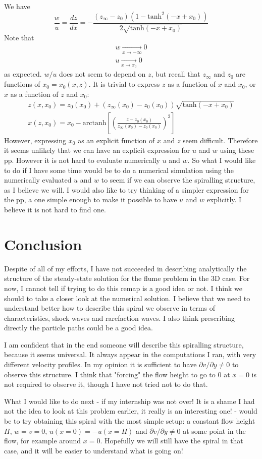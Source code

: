 \documentclass[11pt]{article}
\begin{document}
We have
\[
\frac{w}{u} = \frac{dz}{dx} = -\frac{(z_\infty - z_0)\left(1-\text{tanh}^2(-x+x_0)\right)}
		{2\sqrt{\text{tanh}(-x+x_0)}}
\]
Note that 
\[
\begin{matrix}
w  \xrightarrow[x \rightarrow -\infty]{} 0 \\
u  \xrightarrow[x \rightarrow x_0]{} 0
\end{matrix}
\]
as expected.
$w/u$ does not seem to depend on $z$, but recall that $z_\infty$ and $z_0$ are functions of $x_0 = x_0(x,z)$.
It is trivial to express $z$ as a function of $x$ and $x_0$, or $x$ as a function of $z$ and $x_0$:
\[
\begin{matrix}
z(x, x_0) = z_0(x_0) + (z_\infty(x_0) - z_0(x_0)) \sqrt {\text{tanh} (-x + x_0)} \\
x(z, x_0) = x_0 - \text{arctanh} \left[ \left( \frac{z - z_0(x_0)}{z_\infty(x_0) - z_0(x_0)} \right)^2 \right]
\end{matrix}
\]
However, expressing $x_0$ as an explicit function of $x$ and $z$ seem difficult.
Therefore it seems unlikely that we can have an explicit expression for $u$ and $w$ using these pp. However it is not hard to evaluate numerically $u$ and $w$. So what I would like to do if I have some time would be to do a numerical simulation using the numerically evaluated $u$ and $w$ to seem if we can observe the spiralling structure, as I believe we will. I would also like to try thinking of a simpler expression for the pp, a one simple enough to make it possible to have $u$ and $w$ explicitly. I believe it is not hard to find one. 

\section{Conclusion}

Despite of all of my efforts, I have not succeeded in describing analytically the structure of the steady-state solution for the flume problem in the 3D case. 
For now, I cannot tell if trying to do this remap is a good idea or not.
I think we should to take a closer look at the numerical solution.
I believe that we need to understand better how to describe this spiral we observe in terms of characteristics, shock waves and rarefaction waves. I also think prescribing directly the particle paths could be a good idea.

 I am confident that in the end someone will describe this spiralling structure, because it seems universal. It always appear in the computations I ran, with very different velocity profiles. In my opinion it is sufficient to have $\partial v / \partial y \neq 0$ to observe this structure. I think that "forcing" the flow height to go to $0$ at $x=0$ is not required to observe it, though I have not tried not to do that.

What I would like to do next - if my internship was not over! It is a shame I had not the idea to look at this problem earlier, it really is an interesting one! - would be to try obtaining this spiral with the most simple setup: a constant flow height $H$, $w=v=0$, $ u ( x = 0 ) = - u ( x = H ) $ and $\partial v / \partial y \neq 0$ at some point in the flow, for example around $x = 0$.
Hopefully we will still have the spiral in that case, and it will be easier to understand what is going on!
\end{document}
